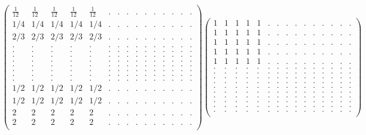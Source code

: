 \documentclass[12pt,a4paper]{amsart}
\begin{document}
\begin{align*}
\left(\begin{array}{rrrrrrrrrrrrrrr}%
\frac{1}{12}&\frac{1}{12}&\frac{1}{12}&\frac{1}{12}&\frac{1}{12}&.&.&.&.&.&.&.&.&.&.\\%
1/4&1/4&1/4&1/4&1/4&.&.&.&.&.&.&.&.&.&.\\%
2/3&2/3&2/3&2/3&2/3&.&.&.&.&.&.&.&.&.&.\\%
.&.&.&.&.&.&.&.&.&.&.&.&.&.&.\\%
.&.&.&.&.&.&.&.&.&.&.&.&.&.&.\\%
.&.&.&.&.&.&.&.&.&.&.&.&.&.&.\\%
.&.&.&.&.&.&.&.&.&.&.&.&.&.&.\\%
.&.&.&.&.&.&.&.&.&.&.&.&.&.&.\\%
.&.&.&.&.&.&.&.&.&.&.&.&.&.&.\\%
.&.&.&.&.&.&.&.&.&.&.&.&.&.&.\\%
.&.&.&.&.&.&.&.&.&.&.&.&.&.&.\\%
1/2&1/2&1/2&1/2&1/2&.&.&.&.&.&.&.&.&.&.\\%
1/2&1/2&1/2&1/2&1/2&.&.&.&.&.&.&.&.&.&.\\%
2&2&2&2&2&.&.&.&.&.&.&.&.&.&.\\%
2&2&2&2&2&.&.&.&.&.&.&.&.&.&.\\%
\end{array}\right)%
\left(\begin{array}{rrrrrrrrrrrrrrr}%
1&1&1&1&1&.&.&.&.&.&.&.&.&.&.\\%
1&1&1&1&1&.&.&.&.&.&.&.&.&.&.\\%
1&1&1&1&1&.&.&.&.&.&.&.&.&.&.\\%
1&1&1&1&1&.&.&.&.&.&.&.&.&.&.\\%
1&1&1&1&1&.&.&.&.&.&.&.&.&.&.\\%
.&.&.&.&.&.&.&.&.&.&.&.&.&.&.\\%
.&.&.&.&.&.&.&.&.&.&.&.&.&.&.\\%
.&.&.&.&.&.&.&.&.&.&.&.&.&.&.\\%
.&.&.&.&.&.&.&.&.&.&.&.&.&.&.\\%
.&.&.&.&.&.&.&.&.&.&.&.&.&.&.\\%
.&.&.&.&.&.&.&.&.&.&.&.&.&.&.\\%
.&.&.&.&.&.&.&.&.&.&.&.&.&.&.\\%
.&.&.&.&.&.&.&.&.&.&.&.&.&.&.\\%
.&.&.&.&.&.&.&.&.&.&.&.&.&.&.\\%
.&.&.&.&.&.&.&.&.&.&.&.&.&.&.\\%
\end{array}\right)%
\end{align*}
\end{document}
